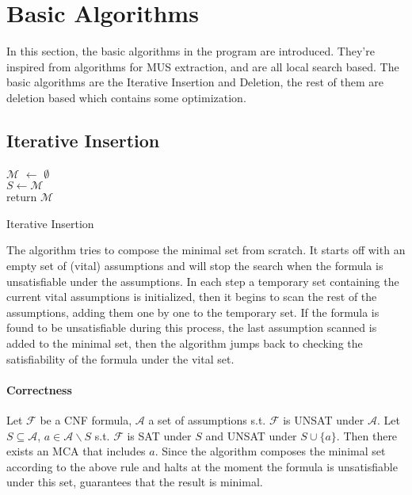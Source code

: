 \documentclass[]{article}
\begin{document}
	
	\pagebreak
	\section{Basic Algorithms}
	In this section, the basic algorithms in the program are introduced. They're inspired from algorithms for MUS extraction\cite{PracticalAlgs}, and are all local search based. The basic algorithms are the Iterative Insertion and Deletion,  the rest of them are deletion based which contains some optimization.
	\subsection{Iterative Insertion}
		\begin{algorithm}[H]
		$ \mathcal{M} $ $\leftarrow$ $\emptyset$\\
		 {
			$  S  \leftarrow  \mathcal{M} $\\
		}
		return $ \mathcal{M} $
		\caption{Iterative Insertion}
	\end{algorithm}
	The algorithm tries to compose the minimal set from scratch. It starts off with an empty set of (vital) assumptions and will stop the search when the formula is unsatisfiable under the  assumptions. In each step a temporary set containing the current vital assumptions is initialized, then it begins to scan the rest of the assumptions, adding them one by one to the temporary set. If the formula is found to be unsatisfiable during this process, the last assumption scanned is added to the minimal set, then the algorithm jumps back to checking the satisfiability of the formula under the vital set.
	
	\paragraph{Correctness} Let $ \mathcal{F} $ be a CNF formula, $ \mathcal{A} $ a set of assumptions s.t. $ \mathcal{F} $ is UNSAT under $ \mathcal{A} $. Let $ S \subseteq \mathcal{A} $, $ a \in \mathcal{A} \backslash S $ s.t. $ \mathcal{F} $ is SAT under $ S $ and UNSAT under $ S \cup \{a\} $. Then there exists an MCA that includes $ a $. Since the algorithm composes the minimal set according to the above rule and halts at the moment the formula is unsatisfiable under this set, guarantees that the result is minimal.
 
\end{document}

